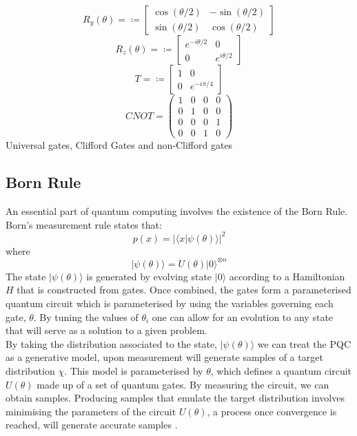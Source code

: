 \documentclass[12pt]{article}
\numberwithin{equation}{section}
\begin{document}
$$
R_y(\theta) = \coloneqq 
\begin{bmatrix}
\cos(\theta/2) & -\sin(\theta/2) \\
\sin(\theta/2) & \cos(\theta/2)
\end{bmatrix}
$$
$$
R_z(\theta) = \coloneqq 
\begin{bmatrix}
e^{-i\theta/2} & 0 \\
0 & e^{i\theta/2}
\end{bmatrix}
$$
$$
T = \coloneqq 
\begin{bmatrix}
1 & 0 \\
0 & e^{-i\pi/4}
\end{bmatrix}
$$
$$
CNOT =
\begin{pmatrix}
1 & 0 & 0 & 0 \\
0 & 1 & 0 & 0 \\
0 & 0 & 0 & 1 \\
0 & 0 & 1 & 0
\end{pmatrix}
$$
Universal gates, Clifford Gates and non-Clifford gates 
\subsection{Born Rule}
An essential part of quantum computing involves the existence of the Born
Rule. Born's measurement rule states that:
\begin{equation}
p(x) = |\langle x|\psi(\theta)\rangle|^2
\end{equation} where 
\begin{equation}
|\psi(\theta)\rangle = U(\theta)|0\rangle^{\otimes n}
\end{equation}
The state $|\psi(\theta)\rangle$ is generated by evolving state $|0\rangle$
according to a Hamiltonian $H$ that is constructed from gates. Once combined, the 
gates form a parameterised quantum circuit which is parameterised by using the 
variables governing each gate, $\theta$. By tuning the values of $\theta_i$ one 
can allow for an evolution to any state that will serve as a solution to a given 
problem. \\ 
By taking the distribution associated to the state, $|\psi(\theta)\rangle$ we can 
treat the PQC as a generative model, upon measurement will 
generate samples of a target distribution $\chi$. This model is parameterised 
by $\theta$, which defines a quantum circuit $U(\theta)$ made up of a set of quantum 
gates.
By measuring the circuit, we can obtain samples. Producing samples that emulate 
the target distribution involves minimising the parameters of the circuit $U(\theta)$, 
a process once convergence is reached, will generate accurate samples 
\cite{liu_differentiable_2018}.
\end{document}
